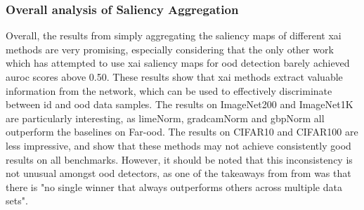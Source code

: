 \documentclass[UKenglish]{uiomasterthesis} %
\theoremstyle{definition}
\begin{document}
\newpage

\subsubsection{Overall analysis of Saliency Aggregation}





Overall, the results from simply aggregating the saliency maps of different \ac{xai} methods are very promising, especially considering that the only other work which has attempted to use \ac{xai} saliency maps for \ac{ood} detection barely achieved \ac{auroc} scores above 0.50. These results show that \ac{xai} methods extract valuable information from the network, which can be used to effectively discriminate between \ac{id} and \ac{ood} data samples. The results on ImageNet200 and ImageNet1K are particularly interesting, as \ac{lime}Norm, \ac{gradcam}Norm and \ac{gbp}Norm all outperform the baselines on Far-\ac{ood}. The results on CIFAR10 and CIFAR100 are less impressive, and show that these methods may not achieve consistently good results on all benchmarks. However, it should be noted that this inconsistency is not unusual amongst \ac{ood} detectors, as one of the takeaways from from \cite{openood15} was that there is "no single winner that always outperforms others across multiple data sets".
\end{document}
